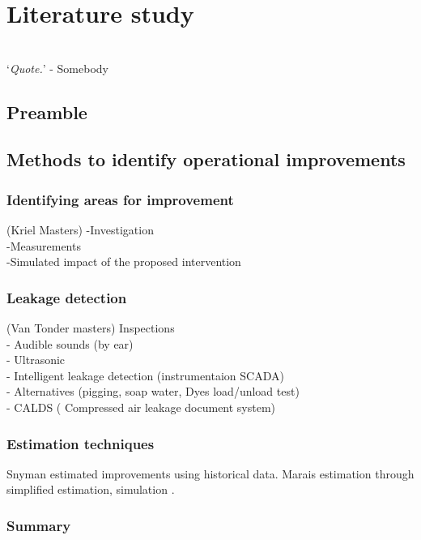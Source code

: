 \chapter{Literature study}
\vspace{38em}

\hrulefill
\\
\enquote*{\textit{Quote.}} - Somebody\\
\newpage
\section{Preamble}
\section{Methods to identify operational improvements}
\subsection{Identifying areas for improvement}
(Kriel Masters)
-Investigation\\
-Measurements\\
-Simulated impact of the proposed intervention\\

\subsection{Leakage detection}
(Van Tonder masters)
Inspections\\
- Audible sounds (by ear)\\
- Ultrasonic\\
- Intelligent leakage detection (instrumentaion SCADA)\\
- Alternatives (pigging, soap water, Dyes load/unload test)\\
-  CALDS ( Compressed air leakage document system)\\

\subsection{Estimation techniques}
Snyman estimated improvements using historical data.\cite{Snyman2011Masters}
Marais estimation through simplified estimation, simulation \cite{Marais2012PhD, marais2013simplification}.

	\subsection{Summary}
